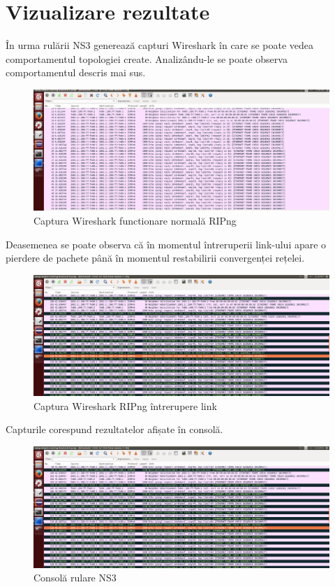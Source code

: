 \documentclass[12pt, a4paper, oneside, romanian]{teza-upb}
\begin{document}
\section{Vizualizare rezultate}
În urma rulării NS3 generează capturi Wireshark în care se poate vedea comportamentul topologiei create. Analizându-le se poate observa comportamentul descris mai sus. 

\begin{figure}[H]
\centering
\includegraphics*[scale=0.25]{img/ripng1.png}
\caption{Captura Wireshark functionare normală RIPng}
\label{fig:punguta}
\end{figure}

Deasemenea se poate observa că în momentul întreruperii link-ului apare o pierdere de pachete până în momentul restabilirii convergenței rețelei.

\begin{figure}[H]
\centering
\includegraphics*[scale=0.25]{img/ripng2.png}
\caption{Captura Wireshark RIPng întrerupere link}
\label{fig:punguta}
\end{figure}

\newpage
Capturile corespund rezultatelor afișate în consolă. 

\begin{figure}[H]
\centering
\includegraphics*[scale=0.25]{img/ripng2.png}
\caption{Consolă rulare NS3}
\label{fig:punguta}
\end{figure}
\end{document}
